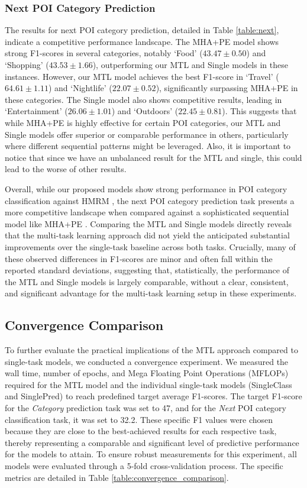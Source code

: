\subsubsection{Next POI Category Prediction}
The results for next POI category prediction, detailed in Table \ref{table:next}, indicate a competitive performance landscape. The MHA+PE model \cite{zeng2019next} shows strong F1-scores in several categories, notably `Food' ($43.47 \pm 0.50$) and `Shopping' ($43.53 \pm 1.66$), outperforming our MTL and Single models in these instances. However, our MTL model achieves the best F1-score in `Travel' ($64.61 \pm 1.11$) and `Nightlife' ($22.07 \pm 0.52$), significantly surpassing MHA+PE in these categories. The Single model also shows competitive results, leading in `Entertainment' ($26.06 \pm 1.01$) and `Outdoors' ($22.45 \pm 0.81$). This suggests that while MHA+PE is highly effective for certain POI categories, our MTL and Single models offer superior or comparable performance in others, particularly where different sequential patterns might be leveraged. Also, it is important to notice that since we have an unbalanced result for the MTL and single, this could lead to the worse of other results.


Overall, while our proposed models show strong performance in POI category classification against HMRM \cite{chen2020modeling}, the next POI category prediction task presents a more competitive landscape when compared against a sophisticated sequential model like MHA+PE \cite{zeng2019next}. Comparing the MTL and Single models directly reveals that the multi-task learning approach did not yield the anticipated substantial improvements over the single-task baseline across both tasks. Crucially, many of these observed differences in F1-scores are minor and often fall within the reported standard deviations, suggesting that, statistically, the performance of the MTL and Single models is largely comparable, without a clear, consistent, and significant advantage for the multi-task learning setup in these experiments.

\subsection{Convergence Comparison}
To further evaluate the practical implications of the MTL approach compared to single-task models, we conducted a convergence experiment. We measured the wall time, number of epochs, and Mega Floating Point Operations (MFLOPs) required for the MTL model and the individual single-task models (SingleClass and SinglePred) to reach predefined target average F1-scores. The target F1-score for the \textit{Category} prediction task was set to 47, and for the \textit{Next} POI category classification task, it was set to 32.2. These specific F1 values were chosen because they are close to the best-achieved results for each respective task, thereby representing a comparable and significant level of predictive performance for the models to attain. To ensure robust measurements for this experiment, all models were evaluated through a 5-fold cross-validation process. The specific metrics are detailed in Table \ref{table:convergence_comparison}.

